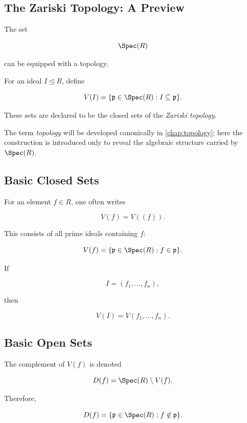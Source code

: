 \subsection{The Zariski Topology: A Preview}
\label{subsec:zariski-topology-preview}

The set

\[ \Spec(R) \]

can be equipped with a topology.

For an ideal \(I\trianglelefteq R\), define

\[ V(I)=\{\mathfrak p\in\Spec(R):I\subseteq\mathfrak p\}. \]

These sets are declared to be the closed sets of the \emph{Zariski topology}.

The term \emph{topology} will be developed canonically in
\cref{chap:topology}; here the construction is introduced only to reveal the
algebraic structure carried by \(\Spec(R)\).

\subsection{Basic Closed Sets}
\label{subsec:basic-zariski-closed}

For an element \(f\in R\), one often writes

\[ V(f)=V((f)). \]

This consists of all prime ideals containing \(f\):

\[ V(f)=\{\mathfrak p\in\Spec(R):f\in\mathfrak p\}. \]

If

\[ I=(f_1,\ldots,f_n), \]

then

\[ V(I)=V(f_1,\ldots,f_n). \]

\subsection{Basic Open Sets}
\label{subsec:basic-zariski-open}

The complement of \(V(f)\) is denoted

\[ D(f)=\Spec(R)\setminus V(f). \]

Therefore,

\[ D(f)=\{\mathfrak p\in\Spec(R):f\notin\mathfrak p\}. \]

